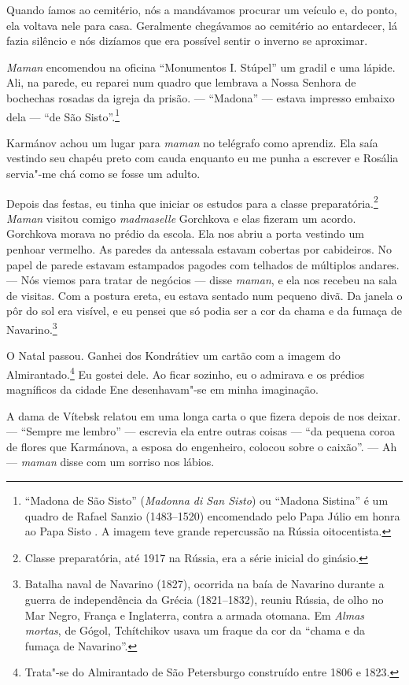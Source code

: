 Quando íamos ao cemitério, nós a mandávamos procurar um veículo e, do
ponto, ela voltava nele para casa. Geralmente chegávamos ao cemitério ao
entardecer, lá fazia silêncio e nós dizíamos que era possível sentir o
inverno se aproximar.

\emph{Maman} encomendou na oficina ``Monumentos I. Stúpel'' um gradil e
uma lápide. Ali, na parede, eu reparei num quadro que lembrava a Nossa
Senhora de bochechas rosadas da igreja da prisão. --- ``Madona'' ---
estava impresso embaixo dela --- ``de São Sisto''.\footnote{``Madona de
  São Sisto'' (\emph{Madonna di San Sisto}) ou ``Madona Sistina'' é um
  quadro de Rafael Sanzio (1483--1520) encomendado pelo Papa Júlio \scalebox{.8}{II} em
  honra ao Papa Sisto \scalebox{.8}{IV}. A imagem teve grande repercussão na Rússia
  oitocentista.}

Karmánov achou um lugar para \emph{maman} no telégrafo como aprendiz.
Ela saía vestindo seu chapéu preto com cauda enquanto eu me punha a
escrever e Rosália servia"-me chá como se fosse um adulto.

Depois das festas, eu tinha que iniciar os estudos para a classe
preparatória.\footnote{Classe preparatória, até 1917 na Rússia, era a
  série inicial do ginásio.} \emph{Maman} visitou comigo
\emph{madmaselle} Gorchkova e elas fizeram um acordo. Gorchkova morava
no prédio da escola. Ela nos abriu a porta vestindo um penhoar vermelho.
As paredes da antessala estavam cobertas por cabideiros. No papel de
parede estavam estampados pagodes com telhados de múltiplos andares. ---
Nós viemos para tratar de negócios --- disse \emph{maman}, e ela nos
recebeu na sala de visitas. Com a postura ereta, eu estava sentado num
pequeno divã. Da janela o pôr do sol era visível, e eu pensei que só
podia ser a cor da chama e da fumaça de Navarino.\footnote{Batalha naval
  de Navarino (1827), ocorrida na baía de Navarino durante a guerra de
  independência da Grécia (1821--1832), reuniu Rússia, de olho no Mar
  Negro, França e Inglaterra, contra a armada otomana. Em \emph{Almas
  mortas}, de Gógol, Tchítchikov usava um fraque da cor da ``chama e da
  fumaça de Navarino''.}

O Natal passou. Ganhei dos Kondrátiev um cartão com a imagem do
Almirantado.\footnote{Trata"-se do Almirantado de São Petersburgo
  construído entre 1806 e 1823.} Eu gostei dele. Ao ficar sozinho, eu o
admirava e os prédios magníficos da cidade Ene desenhavam"-se em minha
imaginação.

A dama de Vítebsk relatou em uma longa carta o que fizera depois de nos
deixar. --- ``Sempre me lembro'' --- escrevia ela entre outras coisas
--- ``da pequena coroa de flores que Karmánova, a esposa do engenheiro,
colocou sobre o caixão''. --- Ah --- \emph{maman} disse com um sorriso
nos lábios.

